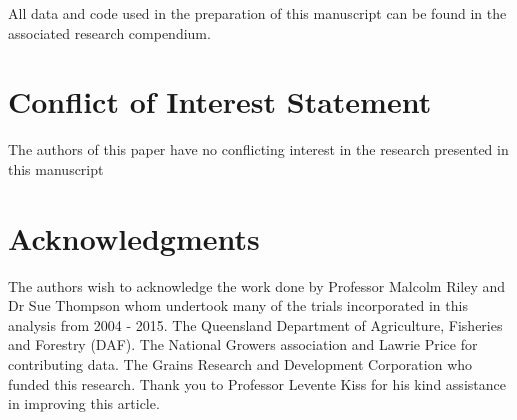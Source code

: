 \documentclass[agronomy,article,submit,moreauthors,pdftex]{mdpi}
\begin{document}
All data and code used in the preparation of this manuscript can be found in the associated research compendium.

\hypertarget{conflict-of-interest-statement}{%
\section{Conflict of Interest Statement}\label{conflict-of-interest-statement}}

The authors of this paper have no conflicting interest in the research presented in this manuscript

\hypertarget{acknowledgments}{%
\section{Acknowledgments}\label{acknowledgments}}

The authors wish to acknowledge the work done by Professor Malcolm Riley and Dr Sue Thompson whom undertook many of the trials incorporated in this analysis from 2004 - 2015.
The Queensland Department of Agriculture, Fisheries and Forestry (DAF).
The National Growers association and Lawrie Price for contributing data.
The Grains Research and Development Corporation who funded this research.
Thank you to Professor Levente Kiss for his kind assistance in improving this article.

%

\vspace{6pt}


\end{document}
